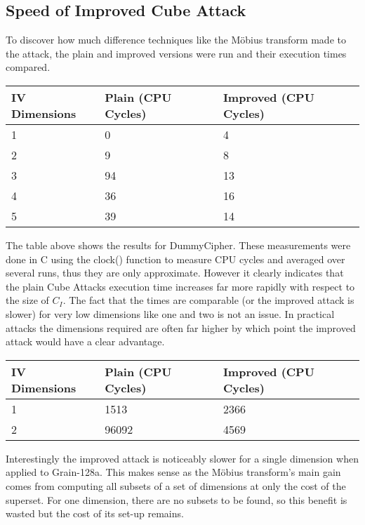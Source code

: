 \documentclass{report}
\let\Oldsubsection\subsection
\renewcommand{\subsection}{\FloatBarrier\Oldsubsection}
\begin{document}
\subsection{Speed of Improved Cube Attack}
To discover how much difference techniques like the M\"{o}bius transform made to the attack, the plain and improved versions were run and their execution times compared.
\begin{center}
    \begin{tabular}{| l | l | l |}
    \hline
    IV Dimensions & Plain (CPU Cycles) & Improved (CPU Cycles)\\ \hline
    1 & 0 & 4\\ \hline
    2 & 9 & 8\\ \hline
    3 & 94 & 13\\ \hline
    4 & 36 & 16\\ \hline
    5 & 39 & 14\\ \hline
    \end{tabular}
\end{center}
The table above shows the results for DummyCipher. These measurements were done in C using the clock() function to measure CPU cycles and averaged over several runs, thus they are only approximate. However it clearly indicates that the plain Cube Attacks execution time increases far more rapidly with respect to the size of $C_I$. The fact that the times are comparable (or the improved attack is slower) for very low dimensions like one and two is not an issue. In practical attacks the dimensions required are often far higher\cite{DinurShamir2009} by which point the improved attack would have a clear advantage. 

\begin{center}
    \begin{tabular}{| l | l | l |}
    \hline
    IV Dimensions & Plain (CPU Cycles) & Improved (CPU Cycles)\\ \hline
    1 & 1513 & 2366\\ \hline
    2 & 96092 & 4569\\ \hline
    \end{tabular}
\end{center}
Interestingly the improved attack is noticeably slower for a single dimension when applied to Grain-128a. This makes sense as the M\"{o}bius transform's main gain comes from computing all subsets of a set of dimensions at only the cost of the superset. For one dimension, there are no subsets to be found, so this benefit is wasted but the cost of its set-up remains.
\end{document}
